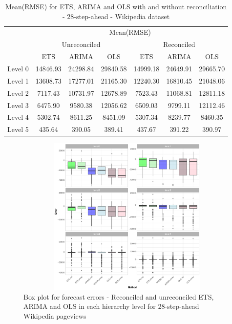 \documentclass[11pt,a4paper,]{article}
\begin{document}
\begin{table}[t]

\caption{\label{tab:wikipediadataresultRMSE}Mean(RMSE) for ETS, ARIMA and OLS with and without reconciliation - 28-step-ahead - Wikipedia dataset}
\centering
\begin{tabular}{ccccccc}
\toprule
\multicolumn{1}{c}{} & \multicolumn{6}{c}{Mean(RMSE)} \\
\cmidrule(l{2pt}r{2pt}){2-7}
\multicolumn{1}{c}{} & \multicolumn{3}{c}{Unreconciled} & \multicolumn{3}{c}{Reconciled} \\
\cmidrule(l{2pt}r{2pt}){2-4} \cmidrule(l{2pt}r{2pt}){5-7}
 & ETS & ARIMA & OLS & ETS & ARIMA & OLS\\
\midrule
Level 0 & 14846.93 & 24298.84 & 29840.58 & 14999.18 & 24649.91 & 29665.70\\
Level 1 & 13608.73 & 17277.01 & 21165.30 & 12240.30 & 16810.45 & 21048.06\\
Level 2 & 7117.43 & 10731.97 & 12678.89 & 7523.43 & 11068.81 & 12811.18\\
Level 3 & 6475.90 & 9580.38 & 12056.62 & 6509.03 & 9799.11 & 12112.46\\
Level 4 & 5302.74 & 8611.25 & 8451.09 & 5307.34 & 8239.77 & 8460.35\\
Level 5 & 435.64 & 390.05 & 389.41 & 437.67 & 391.22 & 390.97\\
\bottomrule
\end{tabular}
\end{table}

\begin{figure}

{\centering \includegraphics[width=450px,height=300px]{Paper-Figures/results_Wikipedia/boxplot_28} 

}

\caption{Box plot for forecast errors -  Reconciled and unreconciled ETS, ARIMA and OLS in each hierarchy level for 28-step-ahead Wikipedia pageviews}\label{fig:boxplotwiki}
\end{figure}
\end{document}
